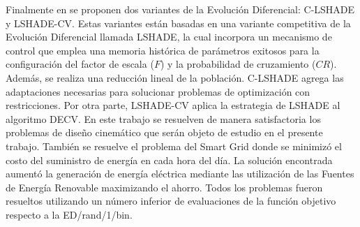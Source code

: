 Finalmente en \cite{zapata_zapata_control_2017}  se proponen dos variantes de la Evolución Diferencial: C-LSHADE y  LSHADE-CV. Estas variantes están basadas en una variante competitiva de la Evolución Diferencial llamada LSHADE, la cual incorpora un mecanismo de control que emplea una memoria histórica de parámetros exitosos para la configuración del factor de escala ($F$) y la probabilidad de cruzamiento ($CR$). Además, se realiza una reducción lineal de la población.  C-LSHADE agrega las adaptaciones necesarias para solucionar problemas de optimización con restricciones. Por otra parte, LSHADE-CV aplica la estrategia de LSHADE al algoritmo DECV. En este trabajo se resuelven de manera satisfactoria los problemas de diseño cinemático que serán objeto de estudio en el presente trabajo. También se resuelve el problema del Smart Grid donde se minimizó el costo del suministro de energía en cada hora del día. La solución encontrada aumentó la generación de energía eléctrica mediante las utilización de las Fuentes de Energía Renovable maximizando el ahorro. Todos los problemas fueron resueltos utilizando un número inferior de evaluaciones de la función objetivo respecto a la ED/rand/1/bin. 
  
